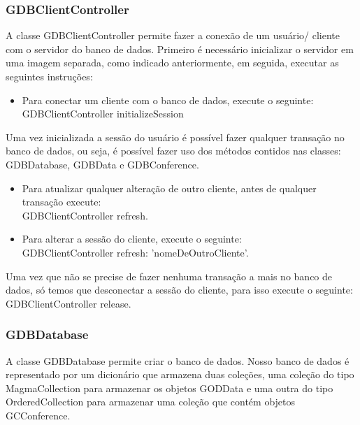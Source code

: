\documentclass[a4paper, 10pt]{article}
\begin{document}
\begin{newpage}
\subsubsection{GDBClientController}

A classe GDBClientController permite fazer a conexão de um usuário/ cliente com o servidor do banco de dados.
Primeiro é necessário inicializar o servidor em uma imagem separada, como indicado anteriormente, em seguida, executar as seguintes instruções:

\begin{itemize}
\item Para conectar um cliente com o banco de dados, execute o seguinte:\\
{GDBClientController initializeSession}
\end{itemize}

Uma vez inicializada a sessão do usuário é possível fazer qualquer transação no banco de dados, ou seja, é possível fazer uso dos métodos contidos nas classes: GDBDatabase, GDBData e GDBConference.


\begin{itemize}
\item Para atualizar qualquer alteração de outro cliente, antes de qualquer transação execute:\\
{GDBClientController refresh.}
\item Para alterar a sessão do cliente, execute o seguinte:\\
{GDBClientController refresh: 'nomeDeOutroCliente'.}
\end{itemize}

Uma vez que não se precise de fazer nenhuma transação a mais no banco de dados, só temos que desconectar a sessão do cliente, para isso execute o seguinte:\\
{GDBClientController release.}



\subsubsection{GDBDatabase}
A classe GDBDatabase permite criar o banco de dados. Nosso banco de dados é representado por um dicionário que armazena duas coleções, uma coleção do tipo MagmaCollection para armazenar os objetos GODData e uma outra do tipo OrderedCollection para armazenar uma coleção que contém objetos GCConference.\\


\end{newpage}
\end{document}
